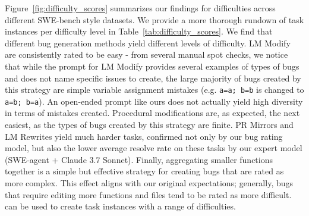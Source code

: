 

Figure~\ref{fig:difficulty_scores} summarizes our findings for difficulties across different SWE-bench style datasets.
We provide a more thorough rundown of task instances per difficulty level in Table~\ref{tab:difficulty_scores}.
We find that different \bugs{} bug generation methods yield different levels of difficulty.
LM Modify are consistently rated to be easy - from several manual spot checks, we notice that while the prompt for LM Modify provides several examples of types of bugs and does not name specific issues to create, the large majority of bugs created by this strategy are simple variable assignment mistakes (e.g. \texttt{a=a; b=b} is changed to \texttt{a=b; b=a}).
An open-ended prompt like ours does not actually yield high diversity in terms of mistakes created.
Procedural modifications are, as expected, the next easiest, as the types of bugs created by this strategy are finite.
PR Mirrors and LM Rewrites yield much harder tasks, confirmed not only by our bug rating model, but also the lower average resolve rate on these tasks by our expert model (SWE-agent + Claude 3.7 Sonnet).
Finally, aggregating smaller functions together is a simple but effective strategy for creating bugs that are rated as more complex.
This effect aligns with our original expectations; generally, bugs that require editing more functions and files tend to be rated as more difficult.
\bugs{} can be used to create task instances with a range of difficulties.